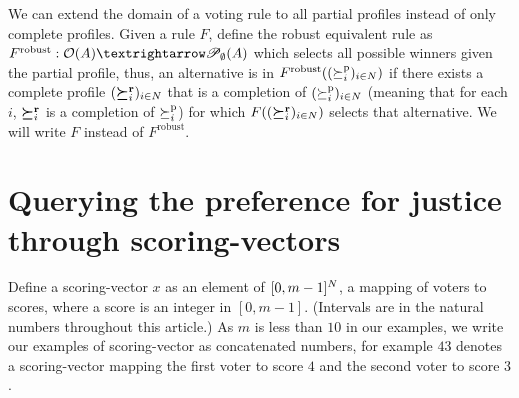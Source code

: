 \documentclass[version=last, pagesize, twoside=off, bibliography=totoc, DIV=calc, fontsize=14pt, a4paper, french, english]{scrartcl}
\begin{document}
We can extend the domain of a voting rule to all partial profiles instead of only complete profiles. Given a rule $F$, define the robust equivalent rule as $F^\text{robust}: \pors → \powersetz{\alts}$ which selects all possible winners given the partial profile, thus, an alternative is in $F^\text{robust}((\succeq_i^\text{p})_{i \in N})$ if there exists a complete profile $(\boldsymbol{\succeq}^\textbf{r}_i)_{i \in N}$ that is a completion of $(\succeq_i^\text{p})_{i \in N}$ (meaning that for each $i$, $\boldsymbol{\succeq}^\textbf{r}_i$ is a completion of $\succeq^\text{p}_i$) for which $F((\boldsymbol{\succeq}^\textbf{r}_i)_{i \in N})$ selects that alternative. We will write $F$ instead of $F^\text{robust}$.

\section{Querying the preference for justice through scoring-vectors}
Define a scoring-vector $x$ as an element of $[0, m-1]^N$, a mapping of voters to scores, where a score is an integer in $[0, m-1]$. (Intervals are in the natural numbers throughout this article.) As $m$ is less than $10$ in our examples, we write our examples of scoring-vector as concatenated numbers, for example $43$ denotes a scoring-vector mapping the first voter to score $4$ and the second voter to score $3$.
\end{document}
